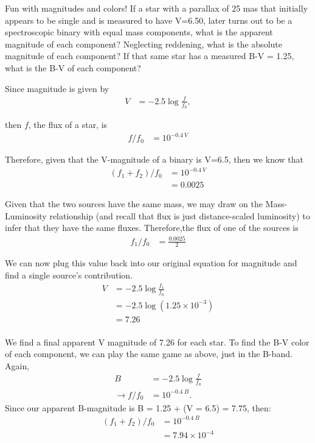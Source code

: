 \documentclass[12pt]{article}
\newenvironment{problem}[2][Problem]{\begin{trivlist}
\item[\hskip \labelsep {\bfseries #1}\hskip \labelsep {\bfseries #2.}]}{\end{trivlist}}
\newenvironment{answer}[2][Answer]{\begin{trivlist}
\item[\hskip \labelsep {\bfseries #1}\hskip \labelsep {\bfseries #2.}]}{\end{trivlist}}
\begin{document}
\bigskip \bigskip
\begin{problem}{4}  Fun with magnitudes and colors! If a star with a parallax of 25 mas that initially appears to be single and is measured to have V=6.50, later turns out to be a spectroscopic binary with equal mass components, what is the apparent magnitude of each component? Neglecting reddening, what is the absolute magnitude of each component? If that same star has a measured B-V = 1.25, what is the B-V of each component?
\end{problem}


\begin{answer}{4}

Since magnitude is given by
\begin{align*}
  V &= -2.5 \log{\frac{f}{f_0}},
\end{align*}

then $f$, the flux of a star, is
\begin{align*}
  f/f_0 &= 10^{-0.4\ V}
\end{align*}

Therefore, given that the V-magnitude of a binary is V=6.5, then we know that
\begin{align*}
  (f_1 + f_2)/f_0 &= 10^{-0.4\ V} \\
                  &= 0.0025
\end{align*}

Given that the two sources have the same mass, we may draw on the Mass-Luminosity relationship (and recall that flux is just distance-scaled luminosity) to infer that they have the same fluxes. Therefore,the flux of one of the sources is
\begin{align*}
  f_1/f_0 &= \frac{0.0025}{2}
\end{align*}

We can now plug this value back into our original equation for magnitude and find a single source's contribution.
\begin{align*}
  V &= -2.5 \log{\frac{f_1}{f_0}} \\
    &= -2.5 \log{(1.25 \times 10^{-3})} \\
    &= 7.26 \\
\end{align*}

We find a final apparent V magnitude of 7.26 for each star. To find the B-V color of each component, we can play the same game as above, just in the B-band. Again,
\begin{align*}
B &= -2.5 \log{\frac{f}{f_0}} \\
\rightarrow f/f_0 &= 10^{-0.4\ B}.
\end{align*}
Since our apparent B-magnitude is B = 1.25 + (V = 6.5) = 7.75, then:
\begin{align*}
(f_1 + f_2)/f_0 &= 10^{-0.4\ B} \\
                &= 7.94 \times 10^{-4}
\end{align*}


\end{answer}
\end{document}
